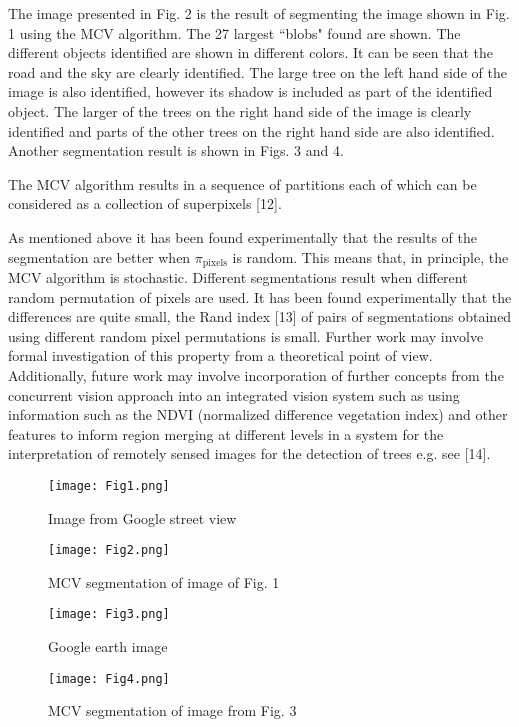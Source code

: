 \documentclass[12pt,twoside]{article}
\begin{document}
The image presented in Fig. 2 is the result of segmenting the image shown in Fig. 1 using the
MCV algorithm. The 27 largest ``blobs" found are shown. The different objects identified are
shown in different colors. It can be seen that the road and the sky are clearly identified. The
large tree on the left hand side of the image is also identified, however its shadow is included
as part of the identified object. The larger of the trees on the right hand side of the image is
clearly identified and parts of the other trees on the right hand side are also identified. Another segmentation 
result is shown in Figs. 3 and 4.

The MCV algorithm results in a sequence of partitions each of which can be considered as a
collection of superpixels [12].

As mentioned above it has been found experimentally that the results of the segmentation
are better when $\pi_{\mbox{pixels}}$ is random. This means that, in principle, the MCV algorithm is stochastic.
Different segmentations result when different random permutation of pixels are used. It
has been found experimentally that the differences are quite small, the Rand index [13] of
pairs of segmentations obtained using different random pixel permutations is small. Further
work may involve formal investigation of this property from a theoretical point of view.
Additionally, future work may involve incorporation of further concepts from the concurrent
vision approach into an integrated vision system such as using information such as the
NDVI (normalized difference vegetation index) and other features to inform region merging
at different levels in a system for the interpretation of remotely sensed images for the detection
of trees e.g. see [14].

\begin{figure}
\centering
\texttt{[image: Fig1.png]}
\caption{Image from Google street view} \label{fig:Fig1}
\end{figure}

\begin{figure}
\centering
\texttt{[image: Fig2.png]}
\caption{MCV segmentation of image of Fig. 1} \label{fig:Fig2}
\end{figure}

\begin{figure}
\centering
\texttt{[image: Fig3.png]}
\caption{Google earth image} \label{fig:Fig3}
\end{figure}

\begin{figure}
\centering
\texttt{[image: Fig4.png]}
\caption{MCV segmentation of image from Fig. 3} \label{fig:Fig4}
\end{figure}
\end{document}
